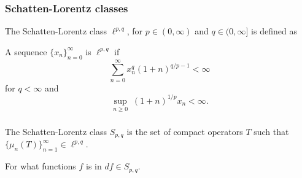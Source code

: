 \documentclass{beamer}
\begin{document}
\begin{frame}
\frametitle{Schatten-Lorentz classes}
The Schatten-Lorentz class $\ell^{p,q}$, for $p \in (0,\infty)$ and $q \in (0,\infty]$ is defined as
\begin{definition}
    A sequence $\{x_n\}_{n=0}^\infty$ is $\ell^{p,q}$ if
    \begin{equation*}
        \sum_{n=0}^\infty x_n^q (1+n)^{q/p-1} < \infty
    \end{equation*}
    for $q < \infty$
    and
    \begin{equation*}
        \sup_{n\geq 0}\; (1+n)^{1/p}x_n < \infty.
    \end{equation*}
\end{definition}
\end{frame}
\begin{frame}
\frametitle{}
\begin{definition}
The Schatten-Lorentz class $S_{p,q}$ is the set
of compact operators $T$ such that $\{\mu_n(T)\}_{n=1}^\infty \in \ell^{p,q}$.
\end{definition}
For what functions $f$ is in $df \in S_{p,q}$.
\end{frame} 
\end{document}
